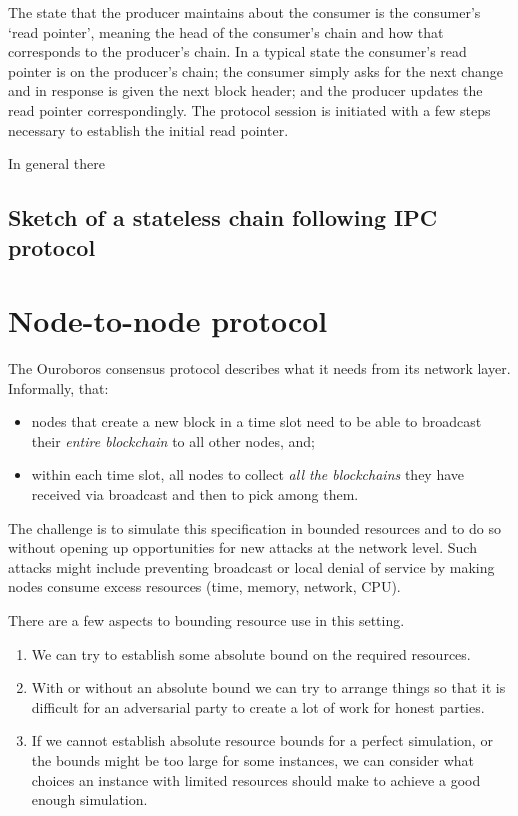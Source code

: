 \documentclass{article}
\theoremstyle{definition}{
  \newtheorem{lemma}{Lemma}[section] %
  \newtheorem{definition}[lemma]{Definition}
}
\theoremstyle{theorem}{
  \newtheorem{invariant}[lemma]{Invariant}
  \newtheorem{proofobligation}[lemma]{Proof Obligation}
}
\numberwithin{equation}{lemma}
\begin{document}
The state that the producer maintains about the consumer is the consumer's
`read pointer', meaning the head of the consumer's chain and how that
corresponds to the producer's chain. In a typical state the consumer's read
pointer is on the producer's chain; the consumer simply asks for the next
change and in response is given the next block header; and the producer updates
the read pointer correspondingly. The protocol session is initiated with a few
steps necessary to establish the initial read pointer.

In general there 

\subsection{Sketch of a stateless chain following IPC protocol}



\section{Node-to-node protocol}

The Ouroboros consensus protocol \citep{ouroboros-classic} describes what it
needs from its network layer. Informally, that:
\begin{itemize}
\item nodes that create a new block in a time slot need to be able to broadcast
      their \emph{entire blockchain} to all other nodes, and;
\item within each time slot, all nodes to collect \emph{all the blockchains}
      they have received via broadcast and then to pick among them.
\end{itemize}

The challenge is to simulate this specification in bounded resources and to do
so without opening up opportunities for new attacks at the network level. Such
attacks might include preventing broadcast or local denial of service by making
nodes consume excess resources (time, memory, network, CPU).

There are a few aspects to bounding resource use in this setting.
\begin{enumerate}
\item We can try to establish some absolute bound on the required resources.
\item With or without an absolute bound we can try to arrange things so that it
      is difficult for an adversarial party to create a lot of work for honest
      parties.
\item If we cannot establish absolute resource bounds for a perfect simulation,
      or the bounds might be too large for some instances, we can consider what
      choices an instance with limited resources should make to achieve a good
      enough simulation.
\end{enumerate}
\end{document}
